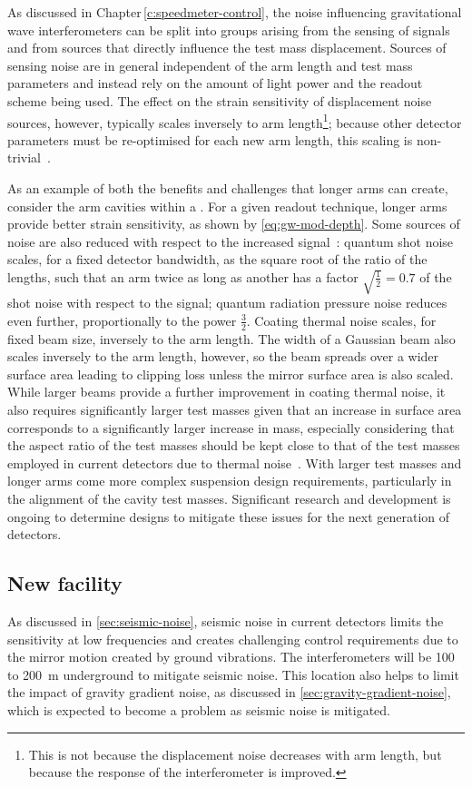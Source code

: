 As discussed in Chapter\,\ref{c:speedmeter-control}, the noise influencing gravitational wave interferometers can be split into groups arising from the sensing of signals and from sources that directly influence the test mass displacement. Sources of sensing noise are in general independent of the arm length and test mass parameters and instead rely on the amount of light power and the readout scheme being used. The effect on the strain sensitivity of displacement noise sources, however, typically scales inversely to arm length\footnote{This is not because the displacement noise decreases with arm length, but because the response of the interferometer is improved.}; because other detector parameters must be re-optimised for each new arm length, this scaling is non-trivial~\cite{Dwyer2015}.

As an example of both the benefits and challenges that longer arms can create, consider the arm cavities within a \FPMI{}. For a given readout technique, longer arms provide better strain sensitivity, as shown by \cref{eq:gw-mod-depth}. Some sources of noise are also reduced with respect to the increased signal~\cite{aligocosmic2016}: quantum shot noise scales, for a fixed detector bandwidth, as the square root of the ratio of the lengths, such that an arm twice as long as another has a factor $\sqrt{\frac{1}{2}} = 0.7$ of the shot noise with respect to the signal; quantum radiation pressure noise reduces even further, proportionally to the power $\frac{3}{2}$. Coating thermal noise scales, for fixed beam size, inversely to the arm length. The width of a Gaussian beam also scales inversely to the arm length, however, so the beam spreads over a wider surface area leading to clipping loss unless the mirror surface area is also scaled. While larger beams provide a further improvement in coating thermal noise, it also requires significantly larger test masses given that an increase in surface area corresponds to a significantly larger increase in mass, especially considering that the aspect ratio of the test masses should be kept close to that of the test masses employed in current detectors due to thermal noise~\cite{Somiya2009a}. With larger test masses and longer arms come more complex suspension design requirements, particularly in the alignment of the cavity test masses. Significant research and development is ongoing to determine designs to mitigate these issues for the next generation of detectors.

\subsection{New facility}
As discussed in \cref{sec:seismic-noise}, seismic noise in current detectors limits the sensitivity at low frequencies and creates challenging control requirements due to the mirror motion created by ground vibrations. The \ET{} interferometers will be \num{100} to \SI{200}{\meter} underground to mitigate seismic noise. This location also helps to limit the impact of gravity gradient noise, as discussed in \cref{sec:gravity-gradient-noise}, which is expected to become a problem as seismic noise is mitigated.

